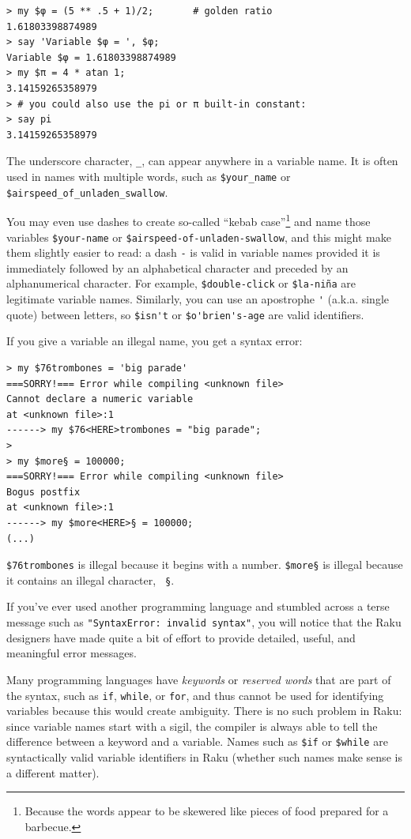 \begin{verbatim}
> my $φ = (5 ** .5 + 1)/2;       # golden ratio
1.61803398874989
> say 'Variable $φ = ', $φ;
Variable $φ = 1.61803398874989
> my $π = 4 * atan 1; 
3.14159265358979
> # you could also use the pi or π built-in constant:
> say pi
3.14159265358979
\end{verbatim}

The underscore character, \verb"_", can appear anywhere in a variable name.
It is often used in names with multiple words, such as 
\verb"$your_name" or \verb"$airspeed_of_unladen_swallow". 

You may even use dashes to create so-called 
``kebab case''\footnote{Because the 
words appear to be skewered like pieces of food prepared for 
a barbecue.} and name those variables 
\verb"$your-name" or \verb"$airspeed-of-unladen-swallow", and this 
might make them slightly easier to read: a dash \verb'-' is 
valid in variable names provided it is immediately followed by an 
alphabetical character and preceded by an alphanumerical character. 
For example, \verb"$double-click" or \verb"$la-niña" are legitimate 
variable names. Similarly, you can use an apostrophe \verb"'" 
(a.k.a. single quote) between letters, so \verb"$isn't" or 
\verb"$o'brien's-age" are valid identifiers.


If you give a variable an illegal name, you get a syntax error:

\begin{verbatim}
> my $76trombones = 'big parade'
===SORRY!=== Error while compiling <unknown file>
Cannot declare a numeric variable
at <unknown file>:1
------> my $76<HERE>trombones = "big parade";
>
> my $more§ = 100000;
===SORRY!=== Error while compiling <unknown file>
Bogus postfix
at <unknown file>:1
------> my $more<HERE>§ = 100000;
(...)
\end{verbatim}
%
{\tt \$76trombones} is illegal because it begins with a number.
{\tt \$more§} is illegal because it contains an illegal character, {\tt
§}. 

If you've ever used another programming language and stumbled 
across a terse message such as {\tt"SyntaxError: invalid syntax"}, 
you will notice that the Raku designers have made quite a bit 
of effort to provide detailed, useful, and meaningful error 
messages. 

Many programming languages have \emph{keywords} or \emph{reserved 
words} that are part of the syntax, such as {\tt if}, {\tt while}, 
or {\tt for}, and thus cannot be used for identifying variables 
because this would create ambiguity. There is no such problem 
in Raku: since variable names start with a sigil, the compiler 
is always able to tell the difference between a keyword and a 
variable. Names such as {\tt \$if} or {\tt \$while} are 
syntactically valid variable identifiers in Raku (whether 
such names make sense is a different matter).



